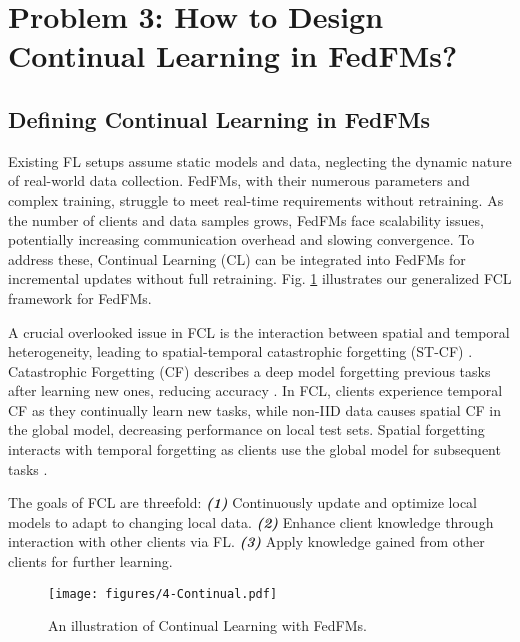 
\section{Problem 3: How to Design Continual Learning in FedFMs?}
\label{cl}
\subsection{Defining Continual Learning in FedFMs}

Existing FL setups assume static models and data, neglecting the dynamic nature of real-world data collection. FedFMs, with their numerous parameters and complex training, struggle to meet real-time requirements without retraining. As the number of clients and data samples grows, FedFMs face scalability issues, potentially increasing communication overhead and slowing convergence. To address these, Continual Learning (CL) can be integrated into FedFMs for incremental updates without full retraining. Fig. \ref{fig:CLwithFM} illustrates our generalized FCL framework for FedFMs.

A crucial overlooked issue in FCL is the interaction between spatial and temporal heterogeneity, leading to spatial-temporal catastrophic forgetting (ST-CF) \cite{yang2024federatedcl}. Catastrophic Forgetting (CF) describes a deep model forgetting previous tasks after learning new ones, reducing accuracy \cite{kirkpatrick2017overcoming,li2017learning}. In FCL, clients experience temporal CF as they continually learn new tasks, while non-IID data causes spatial CF in the global model, decreasing performance on local test sets. Spatial forgetting interacts with temporal forgetting as clients use the global model for subsequent tasks \cite{yang2024federatedcl}.

The goals of FCL are threefold: \textbf{\textit{(1)}} Continuously update and optimize local models to adapt to changing local data. \textbf{\textit{(2)}} Enhance client knowledge through interaction with other clients via FL. \textbf{\textit{(3)}} Apply knowledge gained from other clients for further learning.

\begin{figure}[htbp]
    \centering
    \texttt{[image: figures/4-Continual.pdf]}
    \caption{An illustration of Continual Learning with FedFMs. 
    }
    \label{fig:CLwithFM}
\end{figure}

